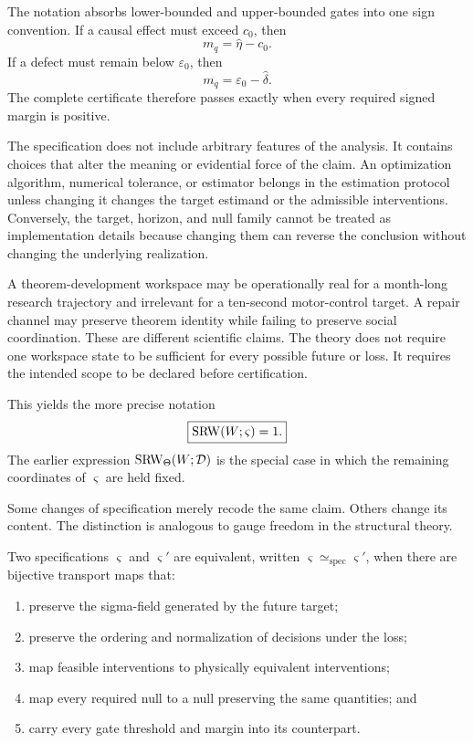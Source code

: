The notation absorbs lower-bounded and upper-bounded gates into one sign
convention. If a causal effect must exceed \(c_0\), then
\[
m_q=\widehat\eta-c_0.
\]
If a defect must remain below \(\varepsilon_0\), then
\[
m_q=\varepsilon_0-\widehat\delta.
\]
The complete certificate therefore passes exactly when every required signed
margin is positive.

The specification does not include arbitrary features of the analysis. It
contains choices that alter the meaning or evidential force of the claim. An
optimization algorithm, numerical tolerance, or estimator belongs in the
estimation protocol unless changing it changes the target estimand or the
admissible interventions. Conversely, the target, horizon, and null family
cannot be treated as implementation details because changing them can reverse
the conclusion without changing the underlying realization.


A theorem-development workspace may be operationally real for a month-long
research trajectory and irrelevant for a ten-second motor-control target. A
repair channel may preserve theorem identity while failing to preserve social
coordination. These are different scientific claims. The theory does not
require one workspace state to be sufficient for every possible future or loss.
It requires the intended scope to be declared before certification.

This yields the more precise notation
\[
\boxed{
\operatorname{SRW}(W;\varsigma)=1.
}
\]
The earlier expression \(\operatorname{SRW}_\Theta(W;\mathcal D)\) is the special case in
which the remaining coordinates of \(\varsigma\) are held fixed.


Some changes of specification merely recode the same claim. Others change its
content. The distinction is analogous to gauge freedom in the structural
theory.

\begin{definition}\label{def:spec-equivalence}
Two specifications \(\varsigma\) and \(\varsigma'\) are equivalent, written
\(\varsigma\simeq_{\mathrm{spec}}\varsigma'\), when there are bijective
transport maps that:
\begin{enumerate}
\item preserve the sigma-field generated by the future target;
\item preserve the ordering and normalization of decisions under the loss;
\item map feasible interventions to physically equivalent interventions;
\item map every required null to a null preserving the same quantities; and
\item carry every gate threshold and margin into its counterpart.
\end{enumerate}
\end{definition}

